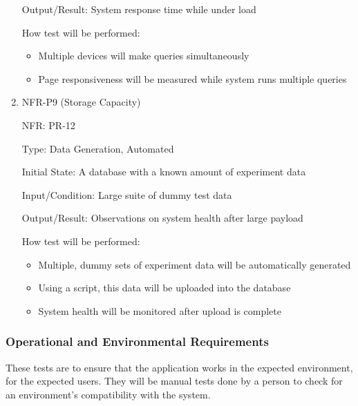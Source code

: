 \documentclass[12pt, titlepage]{article}
\begin{document}
\begin{enumerate}
  Output/Result: System response time while under load
  
  How test will be performed:
  \begin{itemize}
    \item Multiple devices will make queries simultaneously
    \item Page responsiveness will be measured while system runs multiple queries
  \end{itemize}

  \item{NFR-P9 (Storage Capacity)\\}
  
  NFR: PR-12
  
  Type: Data Generation, Automated
  
  Initial State: A database with a known amount of experiment data
  
  Input/Condition: Large suite of dummy test data
  
  Output/Result: Observations on system health after large payload
  
  How test will be performed:
  \begin{itemize}
    \item Multiple, dummy sets of experiment data will be automatically generated
    \item Using a script, this data will be uploaded into the database
    \item System health will be monitored after upload is complete
  \end{itemize}
  \end{enumerate}

\subsubsection{Operational and Environmental Requirements}
  These tests are to ensure that the application works in the expected
  environment, for the expected users. They will be manual tests done by a
  person to check for an environment's compatibility with the system.
\end{document}
